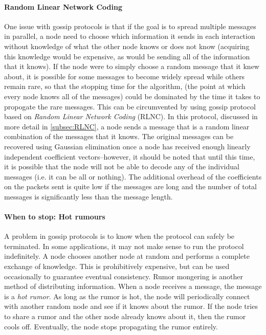 \documentclass{article} %
\begin{document}
\paragraph{Random Linear Network Coding}
One issue with gossip protocols is that if the goal is to spread multiple messages in parallel, a node need to choose which information it sends in each interaction without knowledge of what the other node knows or does not know (acquiring this knowledge would be expensive, as would be sending all of the information that it knows). If the node were to simply choose a random message that it knew about, it is possible for some messages to become widely spread while others remain rare, so that the stopping time for the algorithm, (the point at which every node knows all of the messages) could be dominated by the time it takes to propogate the rare messages. This can be circumvented by using gossip protocol based on \emph{Random Linear Network Coding} (RLNC). In this protocol, discussed in more detail in \ref{subsec:RLNC}, a node sends a message that is a random linear combination of the messages that it knows. The original messages can be recovered using Gaussian elimination once a node has received enough linearly independent coefficient vectors--however, it should be noted that until this time, it is possible that the node will not be able to decode any of the individual messages (i.e. it can be all or nothing). The additional overhead of the coefficients on the packets sent is quite low if the messages are long and the number of total messages is significantly less than the message length.

\paragraph{When to stop: Hot rumours}
A problem in gossip protocols is to know when the protocol can safely be terminated. In some applications, it may not make sense to run the protocol indefinitely. A node chooses another node at random and performs a complete exchange of knowledge. This is prohibitively expensive, but can be used occasionally to guarantee eventual consistency. Rumor mongering is another method of distributing information. When a node receives a message, the message is a \textit{hot rumor}. As long as the rumor is hot, the node will periodically connect with another random node and see if it knows about the rumor. If the node tries to share a rumor and the other node already knows about it, then the rumor cools off. Eventually, the node stops propagating the rumor entirely. 
\end{document}
